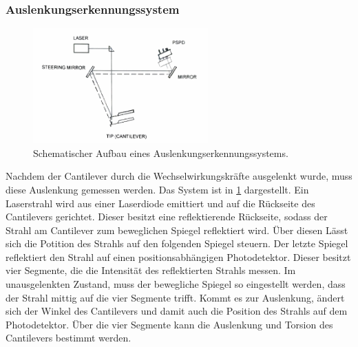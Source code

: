 \subsubsection{Auslenkungserkennungssystem}
\begin{figure}
    \centering
    \includegraphics[width=0.6\textwidth]{../assets/messmethoden/afm/02_beam}
    \caption{Schematischer Aufbau eines Auslenkungserkennungssystems. }
    \label{fig:afm-beam}
\end{figure}
Nachdem der Cantilever durch die Wechselwirkungskräfte ausgelenkt wurde, muss diese Auslenkung gemessen werden.
Das System ist in \cref{fig:afm-beam} dargestellt.
Ein Laserstrahl wird aus einer Laserdiode emittiert und auf die Rückseite des Cantilevers gerichtet.
Dieser besitzt eine reflektierende Rückseite, sodass der Strahl am Cantilever zum beweglichen Spiegel reflektiert wird.
Über diesen Lässt sich die Potition des Strahls auf den folgenden Spiegel steuern.
Der letzte Spiegel reflektiert den Strahl auf einen positionsabhängigen Photodetektor.
Dieser besitzt vier Segmente, die die Intensität des reflektierten Strahls messen.
Im unausgelenkten Zustand, muss der bewegliche Spiegel so eingestellt werden, dass der Strahl mittig auf die vier
Segmente trifft.
Kommt es zur Auslenkung, ändert sich der Winkel des Cantilevers und damit auch die Position des Strahls auf dem
Photodetektor.
Über die vier Segmente kann die Auslenkung und Torsion des Cantilevers bestimmt werden.

